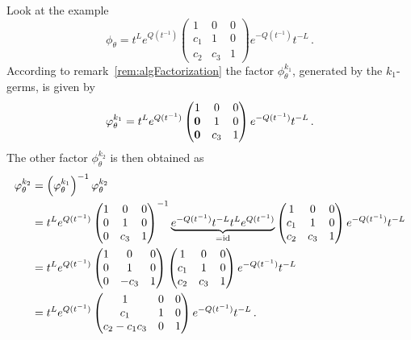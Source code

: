 Look at the example
\[
  \phi_\theta=
  t^{L}e^{Q(t^{-1})}
  \begin{pmatrix}
    1 & 0 & 0
  \\c_1 & 1 & 0
  \\c_2 & c_3 & 1
  \end{pmatrix}
  e^{-Q(t^{-1})}t^{-L} \,.
\]
According to remark~\ref{rem:algFactorization} the factor $\phi_\theta^{k_1}$,
generated by the $k_1$-germs, is given by 
\[
  \phi_\theta^{k_1}=
  t^{L}e^{Q(t^{-1})}
  \begin{pmatrix}
    1 & 0 & 0
  \\\text{\boldmath $0$} & 1 & 0
  \\\text{\boldmath $0$} & c_3 & 1
  \end{pmatrix}
  e^{-Q(t^{-1})}t^{-L} \,.
\]
The other factor $\phi_\theta^{k_2}$ is then obtained as
\begin{align*}
  \phi_\theta^{k_2}&=
  \left(\phi_\theta^{k_1}\right)^{-1}
  \phi_\theta^{k_2}
\\&=t^{L}e^{Q(t^{-1})}
  \begin{pmatrix}
    1     & 0    & 0
  \\0     & 1    & 0
  \\0     & c_3 & 1
  \end{pmatrix}^{-1}
  \underset{=\id}{\underbrace{%
      e^{-Q(t^{-1})}t^{-L}
      t^{L}e^{Q(t^{-1})}
  }}
  \begin{pmatrix}
    1     & 0 & 0
  \\c_1     & 1     & 0
  \\c_2     & c_3 & 1
  \end{pmatrix}
  e^{-Q(t^{-1})}t^{-L}
\\&=t^{L}e^{Q(t^{-1})}
  \begin{pmatrix}
    1     & 0    & 0
  \\0     & 1    & 0
  \\0     & -c_3 & 1
  \end{pmatrix}
  \begin{pmatrix}
    1     & 0 & 0
  \\c_1     & 1     & 0
  \\c_2     & c_3 & 1
  \end{pmatrix}
  e^{-Q(t^{-1})}t^{-L}
\\&=t^{L}e^{Q(t^{-1})}
  \begin{pmatrix}
    1     & 0 & 0
  \\c_1     & 1          & 0
  \\c_2-c_1c_3     & 0          & 1
  \end{pmatrix}
  e^{-Q(t^{-1})}t^{-L}
  \,.
\end{align*}


